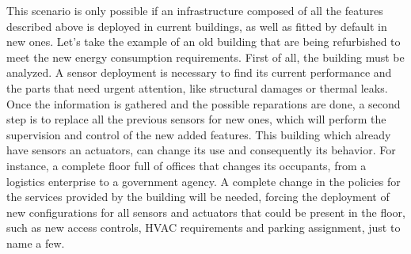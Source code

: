 This scenario is only possible if an infrastructure composed of all the features described above is deployed in current buildings, as well as fitted by default in new ones.
Let's take the example of an old building that are being refurbished to meet the new energy consumption requirements.
First of all, the building must be analyzed.
A sensor deployment is necessary to find its current performance and the parts that need urgent attention, like structural damages or thermal leaks.
Once the information is gathered and the possible reparations are done, a second step is to replace all the previous sensors for new ones, which will perform the supervision and control of the new added features.
This building which already have sensors an actuators, can change its use and consequently its behavior.
For instance, a complete floor full of offices that changes its occupants, from a logistics enterprise to a government agency.
A complete change in the policies for the services provided by the building will be needed, forcing the deployment of new configurations for all sensors and actuators that could be present in the floor, such as new access controls, HVAC requirements and parking assignment, just to name a few.

